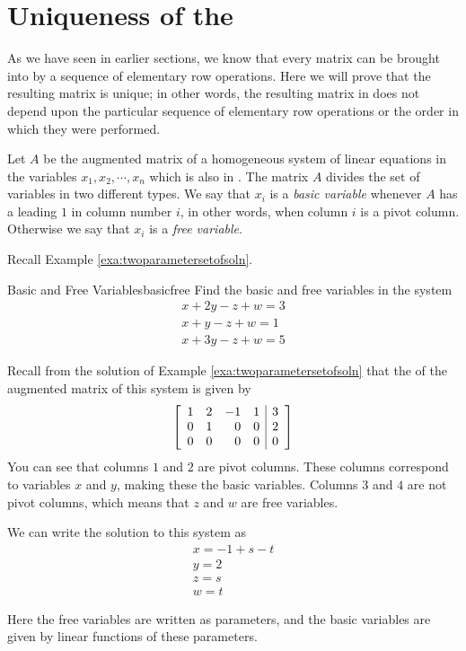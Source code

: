 \section{Uniqueness of the\RREF}

As we have seen in earlier sections, we know that every matrix can be brought into \rref \;by a sequence of elementary row operations. Here we will prove that the resulting matrix is unique; in other words, the resulting matrix in \rref\;does not depend upon the particular sequence of elementary row operations or the order in which they were performed. 

Let $A$ be the augmented matrix of a homogeneous system of linear
equations in the variables $x_1, x_2, \cdots, x_n$ which is also in
\rref. The matrix $A$ divides the set of variables in two different
types. We say that $x_i$ is a {\em basic variable}     whenever $A$ has
a leading $1$ in column number $i$, in other words, when column $i$ is
a pivot column. Otherwise we say that $x_i$ is a {\em free
variable\em}. 

Recall Example \ref{exa:twoparametersetofsoln}.

\begin{example}{Basic and Free Variables}{basicfree}
Find the basic and free variables in the system
\[
\begin{array}{c}
x+2y-z+w=3 \\
x+y-z+w=1 \\
x+3y-z+w=5
\end{array}
\]
\end{example}

\begin{solution}
Recall from the solution of Example \ref{exa:twoparametersetofsoln} that the \ef \;of the augmented matrix of this system is given by
\[
\left[
\begin{array}{rrrr|r}
1 & 2 & -1 & 1 & 3 \\
0 & 1 & 0 & 0 & 2 \\
0 & 0 & 0 & 0 & 0
\end{array}
\right]  
\]
You can see that columns $1$ and $2$ are pivot columns. These columns correspond to variables $x$ and $y$, making these the basic variables. Columns $3$ and $4$ are not pivot columns, which means that $z$ and $w$ are free variables.

We can write the solution to this system as 
\[
\begin{array}{c}
x=-1+s-t \\
y=2 \\
z=s \\
w=t
\end{array}
\]

Here the free variables are written as parameters, and the basic variables are given by linear functions of these parameters. 
\end{solution}

